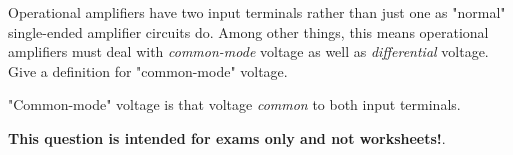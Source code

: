 

Operational amplifiers have two input terminals rather than just one as "normal" single-ended amplifier circuits do.  Among other things, this means operational amplifiers must deal with {\it common-mode} voltage as well as {\it differential} voltage.  Give a definition for "common-mode" voltage.







"Common-mode" voltage is that voltage {\it common} to both input terminals.







{\bf This question is intended for exams only and not worksheets!}.




